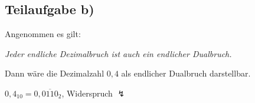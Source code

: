 \documentclass{llncs}
\begin{document}
\subsection*{Teilaufgabe b)}

Angenommen es gilt:
\begin{center}
\textit{Jeder endliche Dezimalbruch ist auch ein endlicher Dualbruch.}
\end{center}
Dann w\"are die Dezimalzahl $0,4$ als endlicher Dualbruch darstellbar.
\begin{center}
$0,4_{10} = 0,\overline{0110}_2$, Widerspruch $\lightning$
\end{center}
\end{document}
